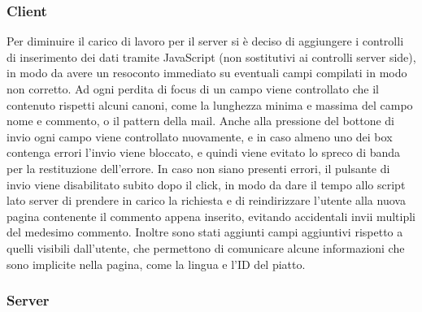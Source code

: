 \documentclass[10pt,a4paper,onecolumn]{article}
\begin{document}
\subsubsection*{Client}

Per diminuire il carico di lavoro per il server si è deciso di aggiungere i controlli di inserimento dei dati tramite JavaScript (non sostitutivi ai controlli server side), in modo da avere un resoconto immediato su eventuali campi compilati in modo non corretto. Ad ogni perdita di focus di un campo viene controllato che il contenuto rispetti alcuni canoni, come la lunghezza minima e massima del campo nome e commento, o il pattern della mail.
Anche alla pressione del bottone di invio ogni campo viene controllato nuovamente, e in caso almeno uno dei box contenga errori l’invio viene bloccato, e quindi viene evitato lo spreco di banda per la restituzione dell’errore. In caso non siano presenti errori, il pulsante di invio viene disabilitato subito dopo il click, in modo da dare il tempo allo script lato server di prendere in carico la richiesta e di reindirizzare l’utente alla nuova pagina contenente il commento appena inserito, evitando accidentali invii multipli del medesimo commento.
Inoltre sono stati aggiunti campi aggiuntivi rispetto a quelli visibili dall’utente, che permettono di comunicare alcune informazioni che sono implicite nella pagina, come la lingua e l’ID del piatto.

\subsubsection*{Server}
\end{document}
